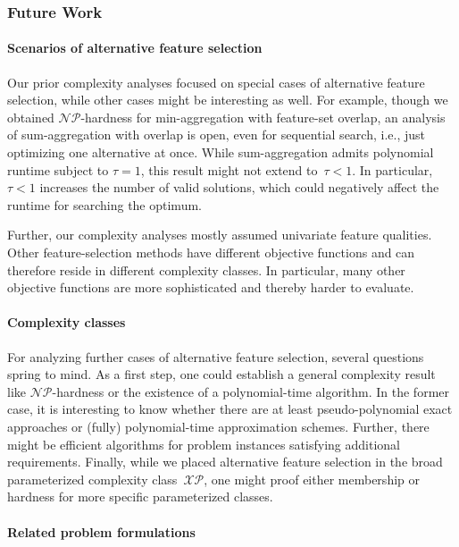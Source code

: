 \documentclass{article}
\theoremstyle{definition}
\begin{document}
\subsubsection{Future Work}
\label{sec:afs:appendix:complexity:future}

\paragraph{Scenarios of alternative feature selection}

Our prior complexity analyses focused on special cases of alternative feature selection, while other cases might be interesting as well.
For example, though we obtained $\mathcal{NP}$-hardness for min-aggregation with feature-set overlap, an analysis of sum-aggregation with overlap is open, even for sequential search, i.e., just optimizing one alternative at once.
While sum-aggregation admits polynomial runtime subject to $\tau=1$, this result might not extend to~$\tau < 1$.
In particular, $\tau < 1$ increases the number of valid solutions, which could negatively affect the runtime for searching the optimum.

Further, our complexity analyses mostly assumed univariate feature qualities.
Other feature-selection methods have different objective functions and can therefore reside in different complexity classes.
In particular, many other objective functions are more sophisticated and thereby harder to evaluate.

\paragraph{Complexity classes}

For analyzing further cases of alternative feature selection, several questions spring to mind.
As a first step, one could establish a general complexity result like $\mathcal{NP}$-hardness or the existence of a polynomial-time algorithm.
In the former case, it is interesting to know whether there are at least pseudo-polynomial exact approaches or (fully) polynomial-time approximation schemes.
Further, there might be efficient algorithms for problem instances satisfying additional requirements.
Finally, while we placed alternative feature selection in the broad parameterized complexity class~$\mathcal{XP}$, one might proof either membership or hardness for more specific parameterized classes.

\paragraph{Related problem formulations}
\end{document}
